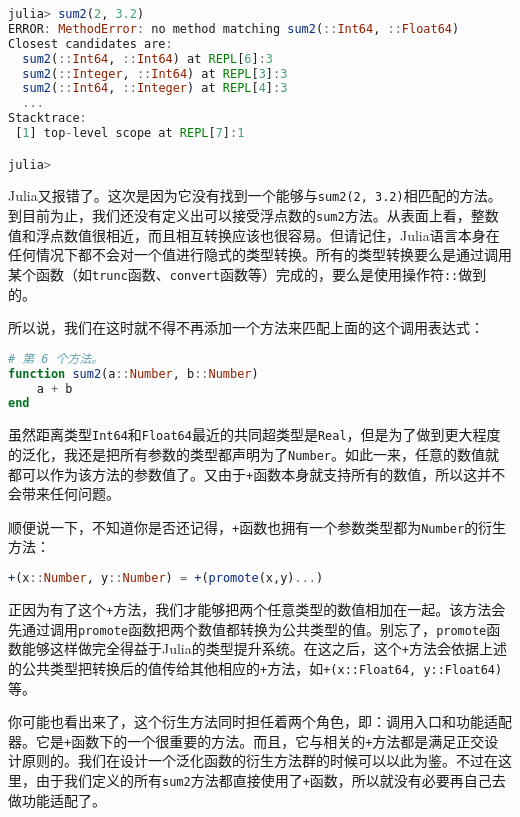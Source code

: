 \begin{lstlisting}[language=julia]
julia> sum2(2, 3.2)
ERROR: MethodError: no method matching sum2(::Int64, ::Float64)
Closest candidates are:
  sum2(::Int64, ::Int64) at REPL[6]:3
  sum2(::Integer, ::Int64) at REPL[3]:3
  sum2(::Int64, ::Integer) at REPL[4]:3
  ...
Stacktrace:
 [1] top-level scope at REPL[7]:1

julia> 
\end{lstlisting}

Julia又报错了。这次是因为它没有找到一个能够与\verb`sum2(2, 3.2)`相匹配的方法。到目前为止，我们还没有定义出可以接受浮点数的\verb`sum2`方法。从表面上看，整数值和浮点数值很相近，而且相互转换应该也很容易。但请记住，Julia语言本身在任何情况下都不会对一个值进行隐式的类型转换。所有的类型转换要么是通过调用某个函数（如\verb`trunc`函数、\verb`convert`函数等）完成的，要么是使用操作符\verb`::`做到的。

所以说，我们在这时就不得不再添加一个方法来匹配上面的这个调用表达式：

\begin{lstlisting}[language=julia]
# 第 6 个方法。
function sum2(a::Number, b::Number)
    a + b
end
\end{lstlisting}

虽然距离类型\verb`Int64`和\verb`Float64`最近的共同超类型是\verb`Real`，但是为了做到更大程度的泛化，我还是把所有参数的类型都声明为了\verb`Number`。如此一来，任意的数值就都可以作为该方法的参数值了。又由于\verb`+`函数本身就支持所有的数值，所以这并不会带来任何问题。

顺便说一下，不知道你是否还记得，\verb`+`函数也拥有一个参数类型都为\verb`Number`的衍生方法：

\begin{lstlisting}[language=julia]
+(x::Number, y::Number) = +(promote(x,y)...)
\end{lstlisting}

正因为有了这个\verb`+`方法，我们才能够把两个任意类型的数值相加在一起。该方法会先通过调用\verb`promote`函数把两个数值都转换为公共类型的值。别忘了，\verb`promote`函数能够这样做完全得益于Julia的类型提升系统。在这之后，这个\verb`+`方法会依据上述的公共类型把转换后的值传给其他相应的\verb`+`方法，如\verb`+(x::Float64, y::Float64)`等。

你可能也看出来了，这个衍生方法同时担任着两个角色，即：调用入口和功能适配器。它是\verb`+`函数下的一个很重要的方法。而且，它与相关的\verb`+`方法都是满足正交设计原则的。我们在设计一个泛化函数的衍生方法群的时候可以以此为鉴。不过在这里，由于我们定义的所有\verb`sum2`方法都直接使用了\verb`+`函数，所以就没有必要再自己去做功能适配了。


